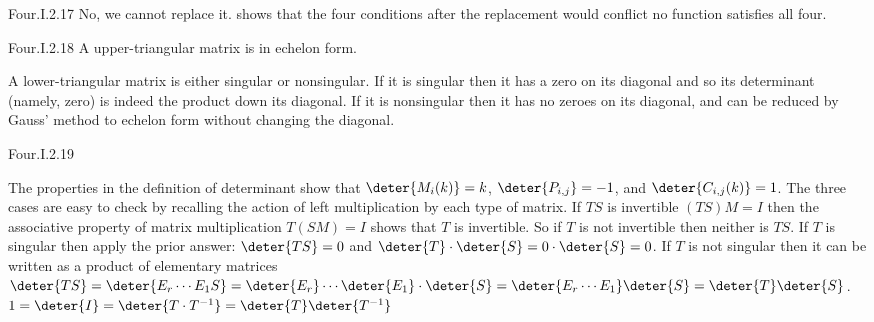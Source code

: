 \begin{ans}{Four.I.2.17}
       No, we cannot replace it.
       shows that the four conditions after the replacement would
       conflict \Dash  no function satisfies all four.
     
\end{ans}
\begin{ans}{Four.I.2.18}
      A upper-triangular matrix is in echelon form.

      A lower-triangular matrix is either singular or nonsingular.
      If it is singular then it has a zero on its diagonal and so its
      determinant (namely, zero) is indeed the product down its diagonal.
      If it is nonsingular then it has no zeroes on its diagonal, and
      can be reduced by Gauss' method to echelon
      form without changing the diagonal.
    
\end{ans}
\begin{ans}{Four.I.2.19}
      \begin{exparts}
        \partsitem The properties in the definition of determinant
          show that
          \( \deter{M_i(k)}=k \),
          \( \deter{P_{i,j}}=-1 \),
          and
          \( \deter{C_{i,j}(k)}=1 \).
        \partsitem The three cases are easy to check by recalling the action
          of left multiplication by each type of matrix.
        \partsitem If \( TS \) is invertible \( (TS)M=I \) then
          the associative property of matrix multiplication
          \( T(SM)=I \) shows that \( T \) is invertible.
          So if \( T \) is not invertible then neither is \( TS \).
        \partsitem If \( T \) is singular then apply the prior answer:
          \( \deter{TS}=0 \) and
          \( \deter{T}\cdot\deter{S}=0\cdot\deter{S}=0 \).
          If \( T \) is not singular then it can be written as a product of
          elementary matrices
          $
            \deter{TS}=\deter{E_r\cdots E_1S}=
            \deter{E_r}\cdots\deter{E_1}\cdot\deter{S}=
            \deter{E_r\cdots E_1}\deter{S}=\deter{T}\deter{S}
          $.
        \partsitem \( 1=\deter{I}=\deter{T\cdot T^{-1}}
                     =\deter{T}\deter{T^{-1}} \)
      \end{exparts}
     
\end{ans}
